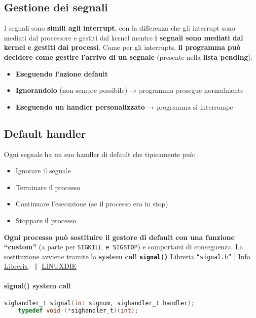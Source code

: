 \subsection{Gestione dei segnali}
I segnali sono \textbf{simili agli interrupt}, con la differenza che gli interrupt sono mediati dal processore e gestiti dal kernel mentre \textbf{i segnali sono mediati dal kernel e gestiti dai processi}. 
Come per gli interrupts, \textbf{il programma può decidere come gestire l'arrivo di un segnale} (presente nella \textbf{lista pending}):
\begin{itemize}
    \item \textbf{Eseguendo l'azione default}
    \item \textbf{Ignorandolo} (non sempre possibile) → programma prosegue normalmente
    \item \textbf{Eseguendo un handler personalizzato} → programma si interrompe
\end{itemize}

\subsection{Default handler}
Ogni segnale ha un suo handler di default che tipicamente può:
\begin{itemize}
    \item Ignorare il segnale
    \item Terminare il processo
    \item Continuare l'esecuzione (se il processo era in stop)
    \item Stoppare il processo
\end{itemize}

\textbf{Ogni processo può sostituire il gestore di default con una funzione “custom”} (a parte per \texttt{SIGKILL e SIGSTOP}) e comportarsi di conseguenza. La sostituzione avviene tramite la \textbf{system call \texttt{signal()}}\newline\newline
Libreria \texttt{“signal.h”} $|$ \href{https://www.tutorialspoint.com/c_standard_library/c_function_signal.htm}{Info Libreria}. $\|$ \href{https://linux.die.net/man/2/signal}{LINUXDIE}
    \paragraph{signal() system call}\hfill \break
\begin{lstlisting}[language=C]
    sighandler_t signal(int signum, sighandler_t handler);
    typedef void (*sighandler_t)(int);
\end{lstlisting}

